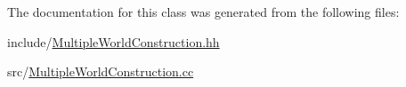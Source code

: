 The documentation for this class was generated from the following files\+:\begin{DoxyCompactItemize}
\item 
include/\hyperlink{MultipleWorldConstruction_8hh}{Multiple\+World\+Construction.\+hh}\item 
src/\hyperlink{MultipleWorldConstruction_8cc}{Multiple\+World\+Construction.\+cc}\end{DoxyCompactItemize}
